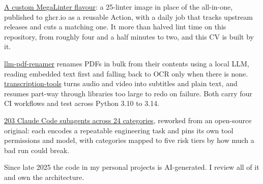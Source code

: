 \descript{ }
\vspace{0.25em}
\begin{tightemize}
  \item \href{https://github.com/laywill/megalinter-custom-flavor-github-latex-markdown}{A custom MegaLinter flavour}: a 25-linter image in place of the all-in-one, published to ghcr.io as a reusable Action, with a daily job that tracks upstream releases and cuts a matching one. It more than halved lint time on this repository, from roughly four and a half minutes to two, and this CV is built by it.
  \item \href{https://github.com/laywill/llm-pdf-renamer}{llm-pdf-renamer} renames PDFs in bulk from their contents using a local LLM, reading embedded text first and falling back to OCR only when there is none. \href{https://github.com/laywill/transcription-tools}{transcription-tools} turns audio and video into subtitles and plain text, and resumes part-way through libraries too large to redo on failure. Both carry four CI workflows and test across Python 3.10 to 3.14. %
  \item \href{https://github.com/laywill/awesome-claude-code-subagents}{203 Claude Code subagents across 24 categories}, reworked from an open-source original: each encodes a repeatable engineering task and pins its own tool permissions and model, with categories mapped to five risk tiers by how much a bad run could break.
  \item Since late 2025 the code in my personal projects is AI-generated. I review all of it and own the architecture.
\end{tightemize}
\sectionsep{}
